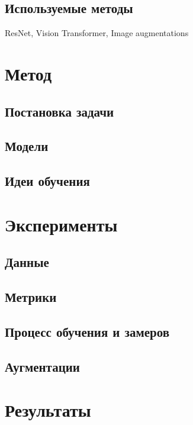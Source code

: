\documentclass[a4paper,12pt]{extarticle}
\begin{document}
\subsection{Используемые методы}

ResNet, Vision Transformer, Image augmentations

\section{Метод}

\subsection{Постановка задачи}

\subsection{Модели}

\subsection{Идеи обучения}

\section{Эксперименты}

\subsection{Данные}

\subsection{Метрики}

\subsection{Процесс обучения и замеров}

\subsection{Аугментации}

\section{Результаты}
\end{document}
